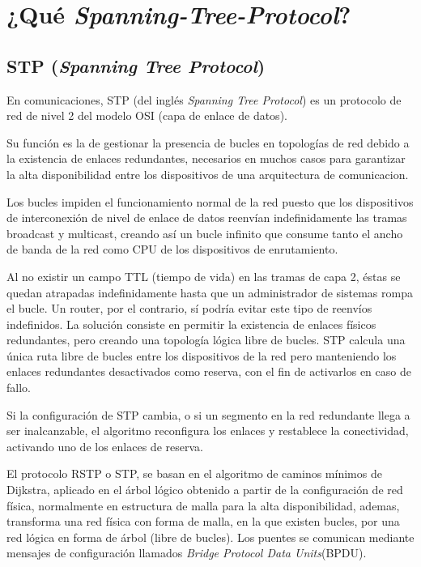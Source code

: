 
\chapter{¿Qué \textit{Spanning-Tree-Protocol}?}

\section{STP (\textit{Spanning Tree Protocol})}

En comunicaciones, STP (del inglés \textit{Spanning Tree Protocol}) es un protocolo de red de nivel 2 del modelo OSI (capa de enlace de datos).

Su función es la de gestionar la presencia de bucles en topologías de red debido a la existencia de enlaces redundantes, necesarios en muchos casos para garantizar la alta disponibilidad entre los dispositivos de una arquitectura de comunicacion.

Los bucles impiden el funcionamiento normal de la red puesto que los dispositivos de interconexión de nivel de enlace de datos reenvían indefinidamente las tramas broadcast y multicast, creando así un bucle infinito que consume tanto el ancho de banda de la red como CPU de los dispositivos de enrutamiento.

Al no existir un campo TTL (tiempo de vida) en las tramas de capa 2, éstas se quedan atrapadas indefinidamente hasta que un administrador de sistemas rompa el bucle. Un router, por el contrario, sí podría evitar este tipo de reenvíos indefinidos. La solución consiste en permitir la existencia de enlaces físicos redundantes, pero creando una topología lógica libre de bucles. STP calcula una única ruta libre de bucles entre los dispositivos de la red pero manteniendo los enlaces redundantes desactivados como reserva, con el fin de activarlos en caso de fallo.

Si la configuración de STP cambia, o si un segmento en la red redundante llega a ser inalcanzable, el algoritmo reconfigura los enlaces y restablece la conectividad, activando uno de los enlaces de reserva.

El protocolo RSTP o STP, se basan en el algoritmo de caminos mínimos de Dijkstra, aplicado en el árbol lógico obtenido a partir de la configuración de red física, normalmente en estructura de malla para la alta disponibilidad, ademas, transforma una red física con forma de malla, en la que existen bucles, por una red lógica en forma de árbol (libre de bucles). Los puentes se comunican mediante mensajes de configuración llamados \textit{Bridge Protocol Data Units}(BPDU).

